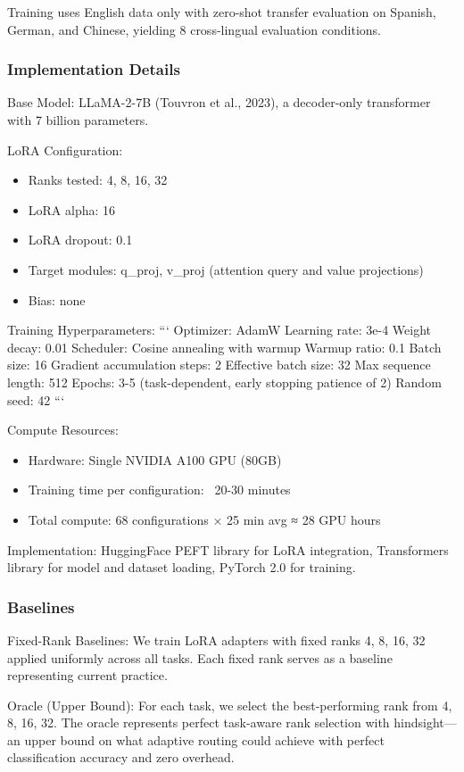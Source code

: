 Training uses English data only with zero-shot transfer evaluation on Spanish, German, and Chinese, yielding 8 cross-lingual evaluation conditions.

\subsubsection{Implementation Details}

Base Model: LLaMA-2-7B (Touvron et al., 2023), a decoder-only transformer with 7 billion parameters.

LoRA Configuration:
\begin{itemize}
\item Ranks tested: {4, 8, 16, 32}
\item LoRA alpha: 16
\item LoRA dropout: 0.1
\item Target modules: q_proj, v_proj (attention query and value projections)
\item Bias: none
\end{itemize}

Training Hyperparameters:
```
Optimizer: AdamW
Learning rate: 3e-4
Weight decay: 0.01
Scheduler: Cosine annealing with warmup
Warmup ratio: 0.1
Batch size: 16
Gradient accumulation steps: 2
Effective batch size: 32
Max sequence length: 512
Epochs: 3-5 (task-dependent, early stopping patience of 2)
Random seed: 42
```

Compute Resources:
\begin{itemize}
\item Hardware: Single NVIDIA A100 GPU (80GB)
\item Training time per configuration: ~20-30 minutes
\item Total compute: 68 configurations × 25 min avg ≈ 28 GPU hours
\end{itemize}

Implementation: HuggingFace PEFT library for LoRA integration, Transformers library for model and dataset loading, PyTorch 2.0 for training.

\subsubsection{Baselines}

Fixed-Rank Baselines: We train LoRA adapters with fixed ranks {4, 8, 16, 32} applied uniformly across all tasks. Each fixed rank serves as a baseline representing current practice.

Oracle (Upper Bound): For each task, we select the best-performing rank from {4, 8, 16, 32}. The oracle represents perfect task-aware rank selection with hindsight—an upper bound on what adaptive routing could achieve with perfect classification accuracy and zero overhead.

